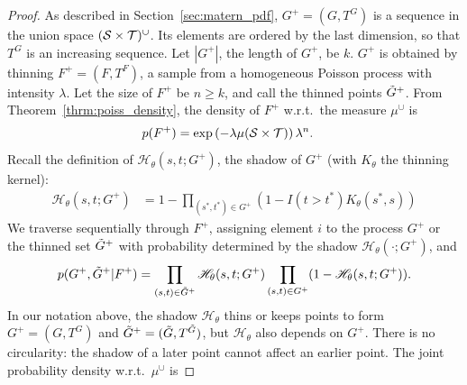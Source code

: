 \documentclass{statsoc}
\begin{document}
\begin{proof}
 As described in Section~\ref{sec:matern_pdf},  $G^+= (G, T^G)$ is a sequence in the union space $({\mathcal S}\times{\mathcal T})^{\cup}$. Its elements are ordered by the last dimension, so that $T^G$ is an
  increasing sequence. Let $|G^+|$, the length of $G^+$, be $k$. $G^+$ is obtained by thinning $F^+=(F,T^F)$, a sample from a homogeneous Poisson 
process with intensity $\lambda$.
Let the size of $F^+$ be $n \ge k$, and call the thinned points $\tilde{G}^+$. %
From Theorem~\ref{thrm:poiss_density}, the density of $F^+$ w.r.t.\ the measure ${\mu}^{\cup}$ is 
\begin{align}
 p(F^+) &= \exp\left(-\lambda \mu({\mathcal S} \times {\mathcal T})\right) \lambda^n. \label{eq:mat_prior_prob_app}
\end{align}
 Recall the definition of $\mathscr{H}_{\theta}(s,t; G^+)$, the shadow of $G^+$
(with $K_{\theta}$ the thinning kernel):
\begin{align}
  \mathscr{H}_{\theta}(s,t;G^+) &= 1 - \prod_{(s^*,t^*) \in G^+} (1 - I(t > t^*) K_{\theta}(s^*, s)) 
\end{align}
 We traverse sequentially through $F^+$, assigning element $i$ to the \matern process $G^+$ or the thinned set $\tilde{G}^+$ with probability determined
 by the shadow $\mathscr{H}_{\theta}(\cdot;G^+)$, and %
\begin{align}
  p(G^+, \tilde{G}^+ | F^+) = \prod_{(s,t) \in \tilde{G}^+} \mathscr{H}_{\theta}(s,t;G^+)  \prod_{(s,t) \in G^+} (1- \mathscr{H}_{\theta}(s,t;G^+)).   \label{eq:mat_marg_app}
\end{align}
In our notation above, the shadow $\mathscr{H}_{\theta}$ thins or keeps points to form $G^+=(G,T^G)$ and $\tilde{G}^+=(\tilde{G}, T^{\tilde{G}})$, but $\mathscr{H}_{\theta}$ also depends on 
$G^+$. There is no circularity: the shadow of a later point cannot affect an earlier point. 
The joint probability density w.r.t.\ $\mu^{\cup}$  is 

\end{proof}
\end{document}
